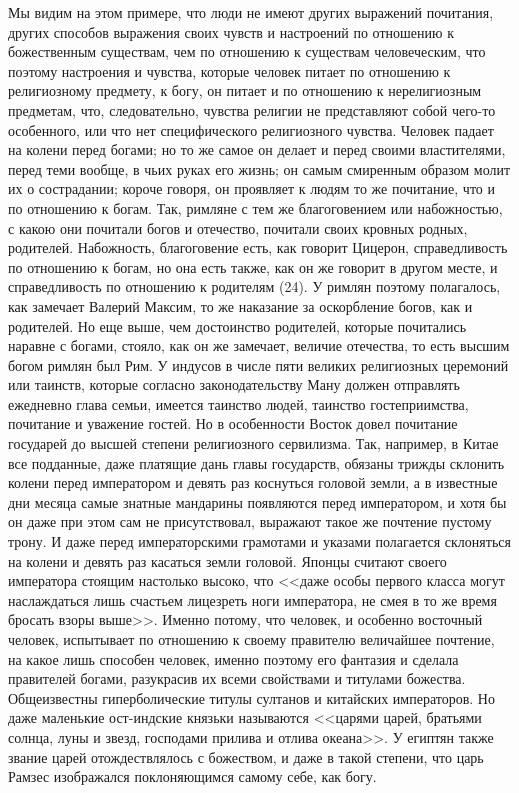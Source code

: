 \documentclass[12pt]{article}
\begin{document}
Мы видим на этом примере, что люди не имеют других выражений почитания, других способов выражения своих чувств и настроений по отношению к божественным существам, чем по отношению к существам человеческим, что поэтому настроения и чувства, которые человек питает по отношению к религиозному предмету, к богу, он питает и по отношению к нерелигиозным предметам, что, следовательно, чувства религии не представляют собой чего-то особенного, или что нет специфического религиозного чувства. Человек падает на колени перед богами; но то же самое он делает и перед своими властителями, перед теми вообще, в чьих руках его жизнь; он самым смиренным образом молит их о сострадании; короче говоря, он проявляет к людям то же почитание, что и по отношению к богам. Так, римляне с тем же благоговением или набожностью, с какою они почитали богов и отечество, почитали своих кровных родных, родителей. Набожность, благоговение есть, как говорит Цицерон, справедливость по отношению к богам, но она есть также, как он же говорит в другом месте, и справедливость по отношению к родителям (24). У римлян поэтому полагалось, как замечает Валерий Максим, то же наказание за оскорбление богов, как и родителей. Но еще выше, чем достоинство родителей, которые почитались наравне с богами, стояло, как он же замечает, величие отечества, то есть высшим богом римлян был Рим. У индусов в числе пяти великих религиозных церемоний или таинств, которые согласно законодательству Ману должен отправлять ежедневно глава семьи, имеется таинство людей, таинство гостеприимства, почитание и уважение гостей. Но в особенности Восток довел почитание государей до высшей степени религиозного сервилизма. Так, например, в Китае все подданные, даже платящие дань главы государств, обязаны трижды склонить колени перед императором и девять раз коснуться головой земли, а в известные дни месяца самые знатные мандарины появляются перед императором, и хотя бы он даже при этом сам не присутствовал, выражают такое же почтение пустому трону. И даже перед императорскими грамотами и указами полагается склоняться на колени и девять раз касаться земли головой. Японцы считают своего императора стоящим настолько высоко, что <<даже особы первого класса могут наслаждаться лишь счастьем лицезреть ноги императора, не смея в то же время бросать взоры выше>>. Именно потому, что человек, и особенно восточный человек, испытывает по отношению к своему правителю величайшее почтение, на какое лишь способен человек, именно поэтому его фантазия и сделала правителей богами, разукрасив их всеми свойствами и титулами божества. Общеизвестны гиперболические титулы султанов и китайских императоров. Но даже маленькие ост-индские князьки называются <<царями царей, братьями солнца, луны и звезд, господами прилива и отлива океана>>. У египтян также звание царей отождествлялось с божеством, и даже в такой степени, что царь Рамзес изображался поклоняющимся самому себе, как богу. 
\end{document}

